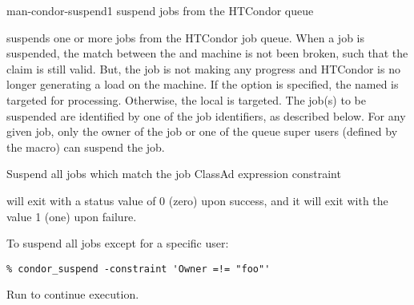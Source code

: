 \begin{ManPage}{}{man-condor-suspend}{1}
{suspend jobs from the HTCondor queue}

\Synopsis {}
\ToolArgsBase

\ToolDebugOption
\ToolLocate
{}

\Description

 suspends one or more jobs from the HTCondor job queue.  
When a job is suspended,
the match between the  and machine is not been broken,
such that the claim is still valid.
But, the job is not making any progress and HTCondor is no longer 
generating a load on the machine.
If the  option is specified, the named  is targeted
for processing.  
Otherwise, the local  is targeted.
The job(s) to be suspended are identified by one of the job identifiers, as
described below.
For any given job, only the owner of the job or one of the queue super users
(defined by the  macro) can suspend the job.

\begin{Options}
	\ToolArgsBaseDesc
	\ToolLocateDesc
    \ToolDebugDesc
	 {Suspend all jobs which match
	                the job ClassAd expression constraint}
\end{Options}

\ExitStatus

 will exit with a status value of 0 (zero) upon success,
and it will exit with the value 1 (one) upon failure.

\Examples
To suspend all jobs except for a specific user:
\footnotesize
\begin{verbatim}
% condor_suspend -constraint 'Owner =!= "foo"'
\end{verbatim}
\normalsize

Run  to continue execution.
\end{ManPage}
